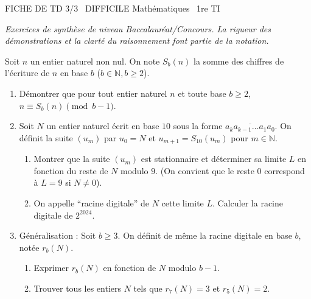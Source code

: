 \documentclass[11pt]{article}
\begin{document}
\begin{tcolorbox}[enhanced,colback=popink,colframe=popink,arc=10pt,boxrule=0pt,left=12pt,right=12pt,top=9pt,bottom=9pt]
{\color{white}\popxbold\small FICHE DE TD 3/3 \textbullet\ DIFFICILE \hfill Mathématiques \textbullet\ 1re TI\par}
\end{tcolorbox}
\vspace{4pt}
\textit{Exercices de synthèse de niveau Baccalauréat/Concours. La rigueur des démonstrations et la clarté du raisonnement font partie de la notation.}

\begin{exercice}
Soit $n$ un entier naturel non nul. On note $S_b(n)$ la somme des chiffres de l'écriture de $n$ en base $b$ ($b \in \mathbb{N}, b \geq 2$).
\begin{enumerate}
    \item Démontrer que pour tout entier naturel $n$ et toute base $b \geq 2$, $n \equiv S_b(n) \pmod{b-1}$.
    \item Soit $N$ un entier naturel écrit en base $10$ sous la forme $\overline{a_ka_{k-1}\dots a_1a_0}$. On définit la suite $(u_m)$ par $u_0 = N$ et $u_{m+1} = S_{10}(u_m)$ pour $m \in \mathbb{N}$.
    \begin{enumerate}
        \item Montrer que la suite $(u_m)$ est stationnaire et déterminer sa limite $L$ en fonction du reste de $N$ modulo $9$. (On convient que le reste $0$ correspond à $L=9$ si $N \neq 0$).
        \item On appelle ``racine digitale'' de $N$ cette limite $L$. Calculer la racine digitale de $2^{2024}$.
    \end{enumerate}
    \item Généralisation : Soit $b \geq 3$. On définit de même la racine digitale en base $b$, notée $r_b(N)$.
    \begin{enumerate}
        \item Exprimer $r_b(N)$ en fonction de $N$ modulo $b-1$.
        \item Trouver tous les entiers $N$ tels que $r_7(N) = 3$ et $r_5(N) = 2$.
    \end{enumerate}
\end{enumerate}
\end{exercice}
\end{document}
